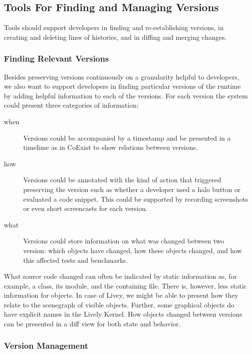 \subsection{Tools For Finding and Managing Versions}

Tools should support developers in finding and re-establishing versions, in creating and deleting lines of histories, and in diffing and merging changes.

\subsubsection{Finding Relevant Versions}

Besides preserving versions continuously on a granularity helpful to developers, we also want to support developers in finding particular versions of the runtime by adding helpful information to each of the versions.
For each version the system could present three categories of information:

\begin{description}
    \item[when] Versions could be accompanied by a timestamp and be presented in a timelime as in CoExist to show relations between versions.
    \item[how] Versions could be annotated with the kind of action that triggered preserving the version such as whether a developer used a halo button or evaluated a code snippet. This could be supported by recording screenshots or even short screencasts for each version.
    \item[what] Versions could store information on what was changed between two version: which objects have changed, how these objects changed, and how this affected tests and benchmarks.
\end{description}

What source code changed can often be indicated by static information as, for example, a class, its module, and the containing file.
There is, however, less static information for objects.
In case of Livey, we might be able to present how they relate to the scenegraph of visible objects.
Further, some graphical objects do have explicit names in the Lively Kernel.
How objects changed between versions can be presented in a diff view for both state and behavior.

\subsubsection{Version Management}

